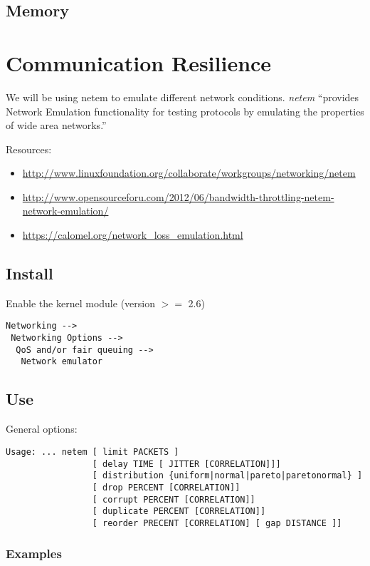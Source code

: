 \subsection{Memory}

\section{Communication Resilience}
\tested{}

We will be using netem to emulate different network conditions. \textit{netem} ``provides Network Emulation functionality for testing protocols by emulating the properties of wide area networks.'' \cite{netem}

\noindent
Resources:
\begin{itemize}
 \item \url{http://www.linuxfoundation.org/collaborate/workgroups/networking/netem}
 \item \url{http://www.opensourceforu.com/2012/06/bandwidth-throttling-netem-network-emulation/}
 \item \url{https://calomel.org/network_loss_emulation.html}
\end{itemize}

\subsection{Install}

Enable the kernel module (version $>=$ 2.6)

\begin{verbatim}
Networking -->
 Networking Options -->
  QoS and/or fair queuing -->
   Network emulator
\end{verbatim}

\subsection{Use}

General options:
\begin{verbatim}
Usage: ... netem [ limit PACKETS ] 
                 [ delay TIME [ JITTER [CORRELATION]]]
                 [ distribution {uniform|normal|pareto|paretonormal} ]
                 [ drop PERCENT [CORRELATION]] 
                 [ corrupt PERCENT [CORRELATION]] 
                 [ duplicate PERCENT [CORRELATION]]
                 [ reorder PRECENT [CORRELATION] [ gap DISTANCE ]]
\end{verbatim}

\subsubsection{Examples}

